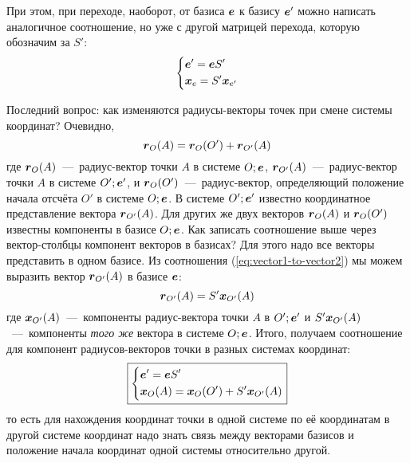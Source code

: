 \documentclass[a4paper,12pt]{article}
\begin{document}
  При этом, при переходе, наоборот, от базиса $\boldsymbol e$ к базису $\boldsymbol e'$
  можно написать аналогичное соотношение, но уже с другой матрицей перехода, которую обозначим за $S'$:
  \[
    \left\{
      \begin{aligned}
        &\boldsymbol e' = \boldsymbol e S'\\
        &\boldsymbol x_{e} = S' \boldsymbol x_{e'}
      \end{aligned}
    \right.
  \]
  
  Последний вопрос: как изменяются радиусы-векторы точек при смене системы координат?
  Очевидно,
  \[
    \boldsymbol r_O(A) = \boldsymbol r_O(O') + \boldsymbol r_{O'}(A)
  \]
  где $\boldsymbol r_O(A)$~---~радиус-вектор точки $A$ в системе $O; \boldsymbol e$,
  $\boldsymbol r_{O'}(A)$~---~радиус-вектор точки $A$ в системе $O'; \boldsymbol e'$,
  и $\boldsymbol r_O(O')$~---~радиус-вектор, определяющий положение начала отсчёта $O'$ в системе $O; \boldsymbol e$.
  В системе $O'; \boldsymbol e'$ известно координатное представление вектора $ \boldsymbol r_{O'}(A)$.
  Для других же двух векторов $\boldsymbol r_O(A)$ и $\boldsymbol r_O(O')$ известны компоненты в базисе $O; \boldsymbol e$.
  Как записать соотношение выше через вектор-столбцы компонент векторов в базисах?
  Для этого надо все векторы представить в одном базисе.
  Из соотношения (\ref{eq:vector1-to-vector2}) мы можем выразить вектор $\boldsymbol r_{O'}(A)$ в базисе $\boldsymbol e$:
  \[
    \boldsymbol r_{O'}(A) = S' \boldsymbol x_{O'}(A)
  \]
  где $\boldsymbol x_{O'}(A)$~---~компоненты радиус-вектора точки $A$ в $O'; \boldsymbol e'$ и $S' \boldsymbol x_{O'}(A)$~---~компоненты \emph{того же} вектора в системе $O; \boldsymbol e$.
  Итого, получаем соотношение для компонент радиусов-векторов точки в разных системах координат:
  \begin{equation}\label{eq:point1-to-point2}
    \boxed{
      \left\{
        \begin{aligned}
          &\boldsymbol e' = \boldsymbol e S'\\
          &\boldsymbol x_O(A) = \boldsymbol x_O(O') + S' \boldsymbol x_{O'}(A)
        \end{aligned}
      \right.
    }
  \end{equation}
  то есть для нахождения координат точки в одной системе по её координатам в другой системе координат надо знать связь между векторами базисов и положение начала координат одной системы относительно другой.
  
\end{document}
